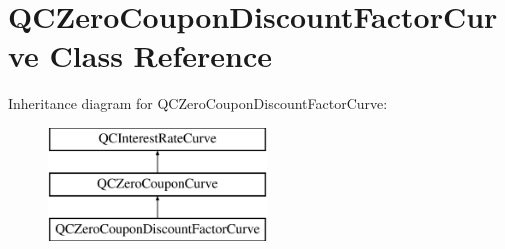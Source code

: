 \hypertarget{class_q_c_zero_coupon_discount_factor_curve}{\section{Q\+C\+Zero\+Coupon\+Discount\+Factor\+Curve Class Reference}
\label{class_q_c_zero_coupon_discount_factor_curve}
}
Inheritance diagram for Q\+C\+Zero\+Coupon\+Discount\+Factor\+Curve\+:\begin{figure}[H]
\begin{center}
\leavevmode
\includegraphics[height=3.000000cm]{class_q_c_zero_coupon_discount_factor_curve}
\end{center}
\end{figure}
